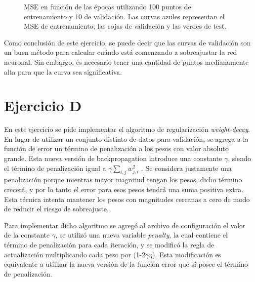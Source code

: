 \documentclass[12pt, a4paper]{article}
\begin{document}
\begin{figure}
\begin{subfigure}[b]{0.45\textwidth}
    \end{subfigure}
    \caption{MSE en función de las épocas utilizando 100 puntos de entrenamiento y 10 de validación. Las curvas azules representan el MSE de entrenamiento, las rojas de validación y las verdes de test.}
\end{figure}

 \bigskip
 
Como conclusión de este ejercicio, se puede decir que las curvas de validación son un buen método para calcular cuándo está comenzando a sobreajustar la red neuronal. Sin embargo, es necesario tener una cantidad de puntos medianamente alta para que la curva sea significativa. 

\section*{Ejercicio D}

En este ejercicio se pide implementar el algoritmo de regularización \textit{weight-decay}. En lugar de utilizar un conjunto distinto de datos para validación, se agrega a la función de error un término de penalización a los pesos con valor absoluto grande. Esta nueva versión de backpropagation introduce una constante $\gamma$, siendo el término de penalización igual a $\gamma \sum_{i,j}^{} w_{j,i}^2  $ . Se considera justamente una penalización porque mientras mayor magnitud tengan los pesos, dicho término crecerá, y por lo tanto el error para esos pesos tendrá una suma positiva extra. Esta técnica intenta mantener los pesos con magnitudes cercanas a cero de modo de reducir el riesgo de sobreajuste.

\bigskip

Para implementar dicho algoritmo se agregó al archivo de configuración el valor de la constante $\gamma$, se utilizó una nueva variable \textit{penalty}, la cual contiene el término de penalización para cada iteración, y se modificó la regla de actualización multiplicando cada peso por (1-2$\gamma \eta$). Esta modificación es equivalente a utilizar la nueva versión de la función error que sí posee el término de penalización.

\bigskip
\end{document}
